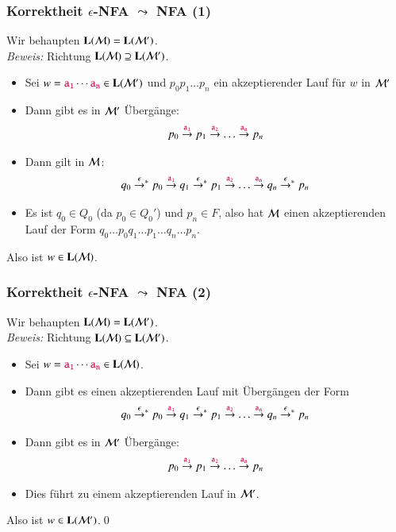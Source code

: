 \documentclass[onlymath]{beamer}
\begin{document}
\begin{frame}

\end{frame}

\begin{frame}[t]\frametitle{Korrektheit $\epsilon$-NFA $\leadsto$ NFA (1)}

Wir behaupten $\textbf{\textcolor{black}{L}}(\mathcal{M})=\textbf{\textcolor{black}{L}}(\mathcal{M}')$.\\[1ex]

\emph{Beweis:} Richtung $\textbf{\textcolor{black}{L}}(\mathcal{M})\supseteq\textbf{\textcolor{black}{L}}(\mathcal{M}')$.\pause

\begin{itemize}
\item Sei $w=\mathtt{\textcolor{purple}{a_1}}\cdots\mathtt{\textcolor{purple}{a_n}}\in \textbf{\textcolor{black}{L}}(\mathcal{M'})$ und $p_0p_1\ldots p_n$ ein akzeptierender Lauf für $w$ in $\mathcal{M'}$\pause
\item Dann gibt es in $\mathcal{M}'$ Übergänge:
\[ p_0\stackrel{\mathtt{\textcolor{purple}{a_1}}}{\to}p_1\stackrel{\mathtt{\textcolor{purple}{a_2}}}{\to}\ldots\stackrel{\mathtt{\textcolor{purple}{a_n}}}{\to}p_n\]\pause
\item Dann gilt in $\mathcal{M}$:
\[ q_0\mathrel{\mathord{\stackrel{\epsilon}{\to}}{}^*} p_0\stackrel{\mathtt{\textcolor{purple}{a_1}}}{\to}q_1\mathrel{\mathord{\stackrel{\epsilon}{\to}}{}^*} p_1\stackrel{\mathtt{\textcolor{purple}{a_2}}}{\to}\ldots\stackrel{\mathtt{\textcolor{purple}{a_n}}}{\to}q_n\mathrel{\mathord{\stackrel{\epsilon}{\to}}{}^*} p_n\]\pause
\item Es ist $q_0\in Q_0$ (da $p_0\in Q_0'$) und $p_n\in F$, also hat $\mathcal{M}$ einen akzeptierenden Lauf der Form $q_0\ldots p_0q_1\ldots p_1\ldots q_n\ldots p_n$.\pause
\end{itemize}
Also ist $w\in\textbf{\textcolor{black}{L}}(\mathcal{M})$.

\end{frame}

\begin{frame}[t]\frametitle{Korrektheit $\epsilon$-NFA $\leadsto$ NFA (2)}

Wir behaupten $\textbf{\textcolor{black}{L}}(\mathcal{M})=\textbf{\textcolor{black}{L}}(\mathcal{M}')$.\\[1ex]

\emph{Beweis:} Richtung $\textbf{\textcolor{black}{L}}(\mathcal{M})\subseteq\textbf{\textcolor{black}{L}}(\mathcal{M}')$.\pause

\begin{itemize}
\item Sei $w=\mathtt{\textcolor{purple}{a_1}}\cdots\mathtt{\textcolor{purple}{a_n}}\in \textbf{\textcolor{black}{L}}(\mathcal{M})$.
\item Dann gibt es einen akzeptierenden Lauf mit Übergängen der Form
\[ q_0\mathrel{\mathord{\stackrel{\epsilon}{\to}}{}^*} p_0\stackrel{\mathtt{\textcolor{purple}{a_1}}}{\to}q_1\mathrel{\mathord{\stackrel{\epsilon}{\to}}{}^*} p_1\stackrel{\mathtt{\textcolor{purple}{a_2}}}{\to}\ldots\stackrel{\mathtt{\textcolor{purple}{a_n}}}{\to}q_n\mathrel{\mathord{\stackrel{\epsilon}{\to}}{}^*} p_n\]\pause
\item Dann gibt es in $\mathcal{M}'$ Übergänge:
\[ p_0\stackrel{\mathtt{\textcolor{purple}{a_1}}}{\to}p_1\stackrel{\mathtt{\textcolor{purple}{a_2}}}{\to}\ldots\stackrel{\mathtt{\textcolor{purple}{a_n}}}{\to}p_n\]
\item Dies führt zu einem akzeptierenden Lauf in $\mathcal{M}'$.
\end{itemize}
Also ist $w\in\textbf{\textcolor{black}{L}}(\mathcal{M}')$.\qed

\end{frame}
\end{document}
